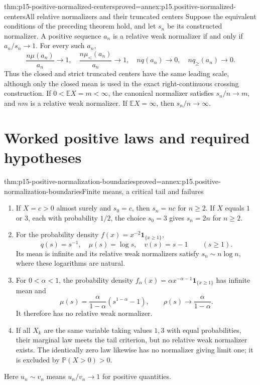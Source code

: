 \begin{hbcorollary}{thm:p15-positive-normalized-centers}{proved=annex:p15.positive-normalized-centers}{All relative normalizers and their truncated centers}
Suppose the equivalent conditions of the preceding theorem hold,
and let \(s_n\) be its constructed normalizer. A positive sequence
\(a_n\) is a relative weak normalizer if and only if \(a_n/s_n\to1\).
For every such \(a_n\),
\[
 \frac{n\mu(a_n)}{a_n}\to1,\quad
 \frac{n\mu_<(a_n)}{a_n}\to1,\quad
 n q(a_n)\to0,\quad n q_{\geq}(a_n)\to0.
\]
Thus the closed and strict truncated centers have the same leading
scale, although only the closed mean is used in the exact
right-continuous crossing construction.
If \(0<\mathbb EX=m<\infty\), the canonical normalizer satisfies
\(s_n/n\to m\), and \(nm\) is a relative weak normalizer.
If \(\mathbb EX=\infty\), then \(s_n/n\to\infty\).
\end{hbcorollary}

\section{Worked positive laws and required hypotheses}
\label{sec:p15-positive-normalization-examples}

\begin{hbtheorem}{thm:p15-positive-normalization-boundaries}{proved=annex:p15.positive-normalization-boundaries}{Finite means, a critical tail and failures}
\begin{enumerate}
\item If \(X=c>0\) almost surely and \(s_0=c\), then \(s_n=nc\)
for \(n\geq2\). If \(X\) equals \(1\) or \(3\), each with
probability \(1/2\), the choice \(s_0=3\) gives \(s_n=2n\)
for \(n\geq2\).
\item For the probability density
\(f(x)=x^{-2}\mathbf1_{\{x\geq1\}}\),
\[
 q(s)=s^{-1},\quad \mu(s)=\log s,\quad
 v(s)=s-1\qquad(s\geq1).
\]
Its mean is infinite and its relative weak normalizers satisfy
\(s_n\sim n\log n\), where these logarithms are natural.
\item For \(0<\alpha<1\), the probability density
\(f_\alpha(x)=\alpha x^{-\alpha-1}\mathbf1_{\{x\geq1\}}\)
has infinite mean and
\[
 \mu(s)=\frac{\alpha}{1-\alpha}(s^{1-\alpha}-1),\qquad
 \rho(s)\longrightarrow\frac{\alpha}{1-\alpha}.
\]
It therefore has no relative weak normalizer.
\item If all \(X_k\) are the same variable taking values \(1,3\)
with equal probabilities, their marginal law meets the tail
criterion, but no relative weak normalizer exists.
The identically zero law likewise has no normalizer giving limit one;
it is excluded by \(\mathbb P(X>0)>0\).
\end{enumerate}
Here \(u_n\sim v_n\) means \(u_n/v_n\to1\) for positive quantities.
\end{hbtheorem}

